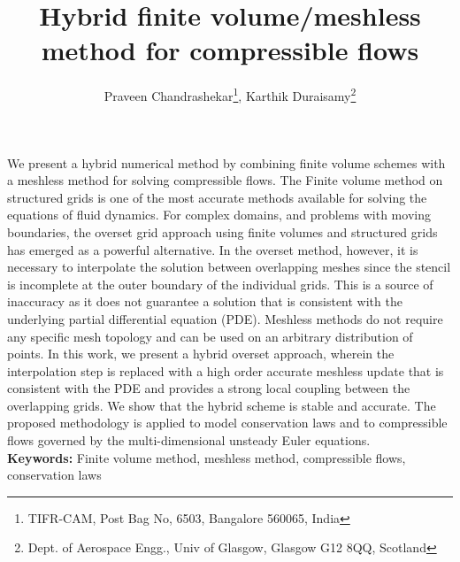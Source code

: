 \documentclass[12pt]{article}
\title{Hybrid finite volume/meshless method for compressible flows}
\author{Praveen Chandrashekar\footnote{TIFR-CAM, Post Bag No, 6503, Bangalore 560065, India}, Karthik Duraisamy\footnote{Dept. of Aerospace Engg., Univ of Glasgow, Glasgow G12 8QQ, Scotland}}
\date{} %
\begin{document}
\maketitle

We present a hybrid numerical method by combining finite volume schemes with a meshless method for solving compressible flows. The Finite volume method on structured grids is one of the most accurate methods available for solving the equations of fluid dynamics. For complex domains, and problems with moving boundaries, the overset grid approach using finite volumes and structured grids has emerged as a powerful alternative. In the overset method, however, it is necessary to interpolate the solution between overlapping meshes since the stencil is incomplete at the outer boundary of the individual grids. This is a source of inaccuracy as it does not guarantee a solution that is consistent with the underlying partial differential equation (PDE). Meshless methods do not require any specific mesh topology and can be used on an arbitrary distribution of points. In this work, we present a hybrid overset approach, wherein the interpolation step is replaced with a high order accurate meshless update that is consistent with the PDE and provides a strong local coupling between the overlapping grids. We show that the hybrid scheme is stable and accurate. The proposed methodology is applied to model conservation laws and to 
compressible flows governed by the multi-dimensional unsteady Euler equations.\\

\noindent
{\bf Keywords:} Finite volume method, meshless method, compressible flows, conservation laws
\end{document}
